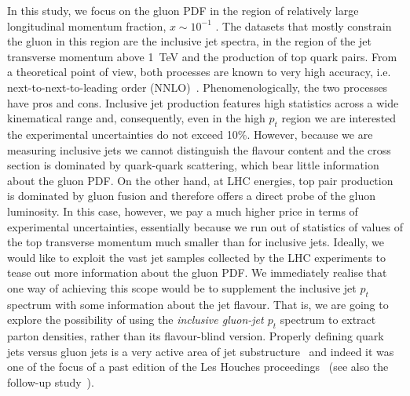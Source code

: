 In this study, we focus on the gluon PDF in the region of relatively large longitudinal momentum fraction, $x\sim 10^{-1}$ . The datasets that mostly constrain the gluon in this region are the inclusive jet spectra, in the region of the jet transverse momentum above 1~TeV and the production of top quark pairs. From a theoretical point of view, both processes are known to very high accuracy, i.e. next-to-next-to-leading order (NNLO)~\cite{}. Phenomenologically, the two processes have pros and cons. Inclusive jet production features high statistics across a wide kinematical range and, consequently, even in the high $p_t$ region we are interested the experimental uncertainties do not exceed 10\%. However, because we are measuring inclusive jets we cannot distinguish the flavour content and the cross section is dominated by quark-quark scattering, which bear little information about the gluon PDF. 
%
On the other hand, at LHC energies, top pair production is dominated by gluon fusion and therefore offers a direct probe of the gluon luminosity. In this case, however, we pay a much higher price in terms of experimental uncertainties, essentially because we run out of statistics of values of the top transverse momentum much smaller than for inclusive jets. 
%
Ideally, we would like to exploit the vast jet samples collected by the LHC experiments to tease out more information about the gluon PDF. We immediately realise that one way of achieving this scope would be to supplement the inclusive jet $p_t$ spectrum with some information about the jet flavour. That is, we are going to explore the possibility of using the \emph{inclusive gluon-jet $p_t$} spectrum to extract parton densities, rather than its flavour-blind version.  Properly defining quark jets versus gluon jets is a very active area of jet substructure~\cite{} and indeed it was one of the focus of a past edition of the Les Houches proceedings~\cite{Badger:2016bpw} (see also the follow-up study~\cite{Gras:2017jty}). 


